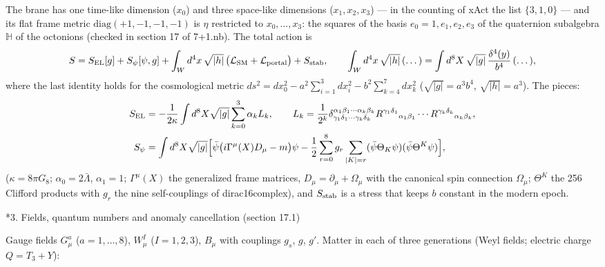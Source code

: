 \documentclass[10pt,a4paper]{article}
\makeatletter
\renewcommand\section{\@startsection{section}{1}{\z@}{-3.5ex \@plus -1ex \@minus -.2ex}{2.3ex \@plus.2ex}{\normalfont\Large\bfseries\raggedright}}
\makeatother
\begin{document}
The brane has one time-like dimension ($x_0$) and three space-like dimensions ($x_1,x_2,x_3$) — in the counting of xAct the list $\{3,1,0\}$ — and its flat frame metric $\mathrm{diag}(+1,-1,-1,-1)$ is $\eta$ restricted to $x_0,\dots,x_3$: the squares of the basis $e_0=1,e_1,e_2,e_3$ of the quaternion subalgebra $\mathbb H$ of the octonions (checked in section 17 of 7+1.nb). The total action is
\begin{equation*}
S=S_{\rm EL}[g]+S_{\psi}[\psi,g]+\int_Wd^4x\,\sqrt{|h|}\,\big(\mathcal L_{\rm SM}+\mathcal L_{\rm portal}\big)+S_{\rm stab},\qquad \int_Wd^4x\,\sqrt{|h|}\,(\dots)=\int d^8X\,\sqrt{|g|}\,\frac{\delta^4(y)}{b^4}\,(\dots),
\end{equation*}
where the last identity holds for the cosmological metric $ds^2=dx_0^2-a^2\sum_{i=1}^3dx_i^2-b^2\sum_{k=4}^7dx_k^2$ ($\sqrt{|g|}=a^3b^4$, $\sqrt{|h|}=a^3$). The pieces:
\begin{align*}
S_{\rm EL}&=-\frac1{2\kappa}\int d^8X\sqrt{|g|}\sum_{k=0}^{3}\alpha_kL_k,\qquad L_k=\frac1{2^k}\delta^{\alpha_1\beta_1\cdots\alpha_k\beta_k}_{\gamma_1\delta_1\cdots\gamma_k\delta_k}R^{\gamma_1\delta_1}{}_{\alpha_1\beta_1}\cdots R^{\gamma_k\delta_k}{}_{\alpha_k\beta_k}, \\
S_\psi&=\int d^8X\sqrt{|g|}\Big[\bar\psi\big(i\Gamma^\mu(X)D_\mu-m\big)\psi-\frac12\sum_{r=0}^{8}g_r\sum_{|K|=r}(\bar\psi\Theta_K\psi)(\bar\psi\Theta^K\psi)\Big],
\end{align*}
($\kappa=8\pi G_8$; $\alpha_0=2\bar\Lambda$, $\alpha_1=1$; $\Gamma^\mu(X)$ the generalized frame matrices, $D_\mu=\partial_\mu+\Omega_\mu$ with the canonical spin connection $\Omega_\mu$; $\Theta^K$ the 256 Clifford products with $g_r$ the nine self-couplings of dirac16complex), and $S_{\rm stab}$ is a stress that keeps $b$ constant in the modern epoch.

\section*{3. Fields, quantum numbers and anomaly cancellation (section 17.1)}
Gauge fields $G^a_\mu$ ($a=1,\dots,8$), $W^I_\mu$ ($I=1,2,3$), $B_\mu$ with couplings $g_s$, $g$, $g'$. Matter in each of three generations (Weyl fields; electric charge $Q=T_3+Y$):
\end{document}
